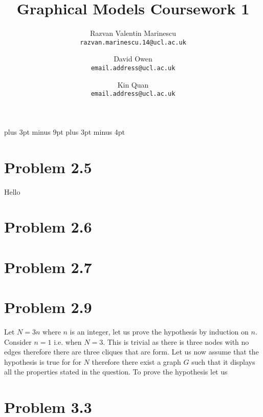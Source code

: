 \documentclass[11pt,a4paper,oneside]{report}
\title{Graphical Models Coursework 1}
\author{
    Razvan Valentin Marinescu\\
    \texttt{razvan.marinescu.14@ucl.ac.uk}
    \and
    David Owen\\
    \texttt{email.address@ucl.ac.uk}
    \and
    Kin Quan\\
    \texttt{email.address@ucl.ac.uk}
}
\begin{document}
\belowdisplayskip=12pt plus 3pt minus 9pt
\belowdisplayshortskip=7pt plus 3pt minus 4pt

\maketitle{}


\section*{Problem 2.5}
Hello

\section*{Problem 2.6}


\section*{Problem 2.7}


\section*{Problem 2.9}
Let $N=3n$ where $n$ is an integer, let us prove the hypothesis by induction on $n$. Consider $n=1$ i.e. when $N=3$. This is trivial as there is three nodes with no edges therefore there are three cliques that are form. Let us now assume that the hypothesis is true for for $N$ therefore there exist a graph $G$ such that it displays all the properties stated in the question. To prove the hypothesis let us  

\section*{Problem 3.3}
\end{document}
